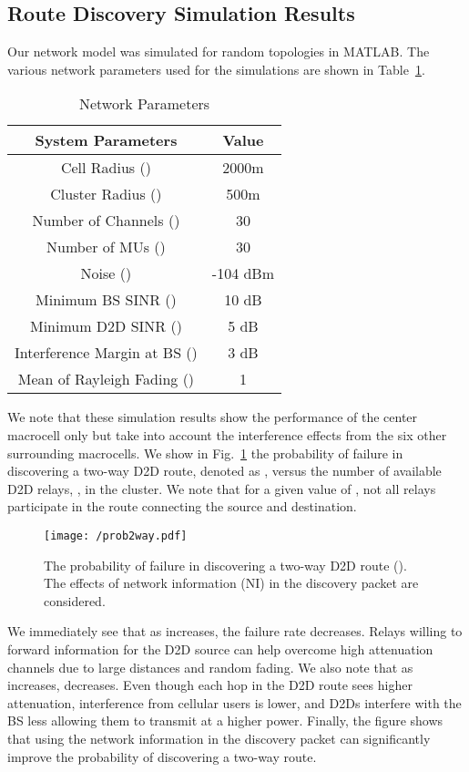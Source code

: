\documentclass[10pt, final, journal, letterpaper,oneside, twocolumn]{IEEEtran}
\begin{document}
\subsection{Route Discovery Simulation Results}
Our network model was simulated for  random topologies in MATLAB. The various network parameters used for the simulations are shown in Table~\ref{table:vars}.  
\begin{table}[htp]
\begin{center}  
\caption{Network Parameters} 
\centering 
\begin{tabular}{|c||c|} 
\hline   
\textbf{System Parameters} & \textbf{Value} \\   
\hline\hline 
Cell Radius () & 2000m\\
\hline
Cluster Radius () & 500m \\
\hline
Number of Channels ()& 30 \\ 
\hline
Number of MUs ()& 30 \\ 
\hline
Noise ()& -104 dBm  \\ 
\hline
Minimum BS SINR ()& 10 dB  \\
\hline  
Minimum D2D SINR  ()& 5 dB  \\ 
\hline
Interference Margin at BS ()& 3 dB  \\
\hline
Mean of Rayleigh Fading ()& 1\\
\hline
\end{tabular} 
\label{table:vars}  
\end{center}
\end{table}
We note that these simulation results show the performance of the center macrocell only but take into account the interference effects from the six other surrounding macrocells.  We show in Fig.~\ref{fig:prob2way} the probability of failure in discovering a two-way D2D route, denoted as , versus the number of available D2D relays, , in the cluster.  We note that for a given value of , not all relays participate in the route connecting the source and destination.
\begin{figure}[htp]
\center
  \texttt{[image: /prob2way.pdf]}
  \caption[]{The probability of failure in discovering a two-way D2D route ().  The effects of network information (NI) in the discovery packet are considered.  } 
  \label{fig:prob2way}
\end{figure}  
We immediately see that as  increases, the failure rate decreases.  Relays willing to forward information for the D2D source can help overcome high attenuation channels due to large distances and random fading.  We also note that as  increases,  decreases.  Even though each hop in the D2D route sees higher attenuation, interference from cellular users is lower, and D2Ds interfere with the BS less allowing them to transmit at a higher power.  Finally, the figure shows that using the network information in the discovery packet can significantly improve the probability of discovering a two-way route.  
\end{document}
